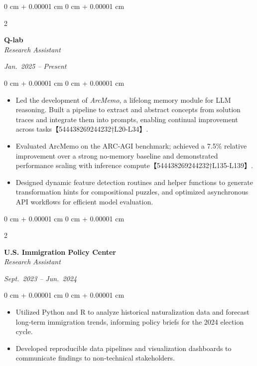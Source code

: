 \documentclass[10pt, letterpaper]{article}
\newenvironment{highlights}{
    \begin{itemize}[
        topsep=0.10 cm,
        parsep=0.10 cm,
        partopsep=0pt,
        itemsep=0pt,
        leftmargin=0 cm + 10pt
    ]
}{
    \end{itemize}
} %
\newenvironment{onecolentry}{
    \begin{adjustwidth}{
        0 cm + 0.00001 cm
    }{
        0 cm + 0.00001 cm
    }
}{
    \end{adjustwidth}
} %
\newenvironment{twocolentry}[2][]{
    \onecolentry
    \def\secondColumn{#2}
    \setcolumnwidth{\fill, 4.5 cm}
    \begin{paracol}{2}
}{
    \switchcolumn \raggedleft \secondColumn
    \end{paracol}
    \endonecolentry
} %
\begin{document}
    \begin{twocolentry}{\textit{Jan.\@ 2025 – Present}}
        \textbf{Q-lab} \\
        \textit{Research Assistant}
    \end{twocolentry}

    \vspace{0.10 cm}
    \begin{onecolentry}
        \begin{highlights}
            \item Led the development of \emph{ArcMemo}, a lifelong memory module for LLM reasoning. Built a pipeline to extract and abstract concepts from solution traces and integrate them into prompts, enabling continual improvement across tasks【544438269244232†L20-L34】.
            \item Evaluated ArcMemo on the ARC‑AGI benchmark; achieved a 7.5\% relative improvement over a strong no‑memory baseline and demonstrated performance scaling with inference compute【544438269244232†L135-L139】.
            \item Designed dynamic feature detection routines and helper functions to generate transformation hints for compositional puzzles, and optimized asynchronous API workflows for efficient model evaluation.
        \end{highlights}
    \end{onecolentry}

    \vspace{0.20 cm}

    \begin{twocolentry}{\textit{Sept.\@ 2023 – Jun.\@ 2024}}
        \textbf{U.S. Immigration Policy Center} \\
        \textit{Research Assistant}
    \end{twocolentry}

    \vspace{0.10 cm}
    \begin{onecolentry}
        \begin{highlights}
            \item Utilized Python and R to analyze historical naturalization data and forecast long‑term immigration trends, informing policy briefs for the 2024 election cycle.
            \item Developed reproducible data pipelines and visualization dashboards to communicate findings to non‑technical stakeholders.
        \end{highlights}
    \end{onecolentry}
\end{document}
